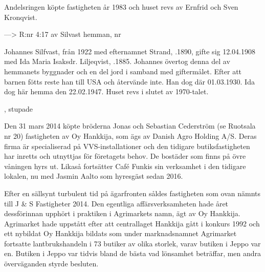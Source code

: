Andelsringen köpte fastigheten år 1983 och huset revs av Ernfrid och Sven Kronqvist.


---> R:nr 4:17 av Silvast hemman, nr 


Johannes Silfvast, från 1922 med efternamnet Strand, .1890, gifte sig 12.04.1908 med Ida Maria Isaksdr. Liljeqvist, .1885. Johannes övertog denna del av hemmanets byggnader och en del jord i samband med giftermålet. Efter att barnen fötts reste han till USA och återvände inte. Han dog där 01.03.1930. Ida dog här hemma den 22.02.1947. Huset revs i slutet av 1970-talet.
\begin{jhchildren}
  \item {}
  \item {}
  \item {}
  \item {}
  \item {}, stupade
  \item {}
\end{jhchildren}




Den 31 mars 2014 köpte bröderna Jonas och Sebastian Cederström (se Ruotsala nr 20) fastigheten av Oy Hankkija, som ägs av Danish Agro Holding A/S. Deras firma är specialiserad på VVS-installationer och den tidigare butiksfastigheten har inretts och utnyttjas för företagets behov. De bostäder som finns på övre våningen hyrs ut. Likaså fortsätter Café Funkis sin verksamhet i den tidigare lokalen, nu med Jasmin Aalto som hyresgäst sedan 2016.



Efter en sällsynt turbulent tid på ägarfronten såldes fastigheten som ovan nämnts till J \& S Fastigheter 2014. Den egentliga affärsverksamheten hade året dessförinnan upphört i praktiken i Agrimarkets namn, ägt av Oy Hankkija. Agrimarket hade uppstått efter att centrallaget Hankkija gått i konkurs 1992 och ett nybildat Oy Hankkija bildats som under marknadsnamnet Agrimarket fortsatte lantbrukshandeln i 73 butiker av olika storlek, varav butiken i Jeppo var en. Butiken i Jeppo var tidvis bland de bästa vad lönsamhet beträffar, men andra överväganden styrde besluten.

